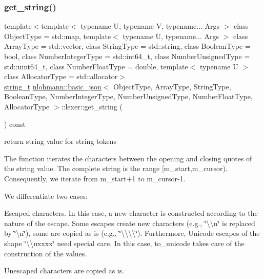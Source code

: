 \subsubsection{\texorpdfstring{get\+\_\+string()}{get\_string()}}
{\footnotesize\ttfamily template$<$template$<$ typename U, typename V, typename... Args $>$ class Object\+Type = std\+::map, template$<$ typename U, typename... Args $>$ class Array\+Type = std\+::vector, class String\+Type  = std\+::string, class Boolean\+Type  = bool, class Number\+Integer\+Type  = std\+::int64\+\_\+t, class Number\+Unsigned\+Type  = std\+::uint64\+\_\+t, class Number\+Float\+Type  = double, template$<$ typename U $>$ class Allocator\+Type = std\+::allocator$>$ \\
\hyperlink{classnlohmann_1_1basic__json_ab63e618bbb0371042b1bec17f5891f42}{string\+\_\+t} \hyperlink{classnlohmann_1_1basic__json}{nlohmann\+::basic\+\_\+json}$<$ Object\+Type, Array\+Type, String\+Type, Boolean\+Type, Number\+Integer\+Type, Number\+Unsigned\+Type, Number\+Float\+Type, Allocator\+Type $>$\+::lexer\+::get\+\_\+string (\begin{DoxyParamCaption}{ }\end{DoxyParamCaption}) const\hspace{0.3cm}{\ttfamily [inline]}}



return string value for string tokens 

The function iterates the characters between the opening and closing quotes of the string value. The complete string is the range \mbox{[}m\+\_\+start,m\+\_\+cursor). Consequently, we iterate from m\+\_\+start+1 to m\+\_\+cursor-\/1.

We differentiate two cases\+:


\begin{DoxyEnumerate}
\item Escaped characters. In this case, a new character is constructed according to the nature of the escape. Some escapes create new characters (e.\+g., {\ttfamily \char`\"{}\textbackslash{}\textbackslash{}n\char`\"{}} is replaced by {\ttfamily \char`\"{}\textbackslash{}n\char`\"{}}), some are copied as is (e.\+g., {\ttfamily \char`\"{}\textbackslash{}\textbackslash{}\textbackslash{}\textbackslash{}\char`\"{}}). Furthermore, Unicode escapes of the shape {\ttfamily \char`\"{}\textbackslash{}\textbackslash{}uxxxx\char`\"{}} need special care. In this case, to\+\_\+unicode takes care of the construction of the values.
\item Unescaped characters are copied as is.
\end{DoxyEnumerate}

